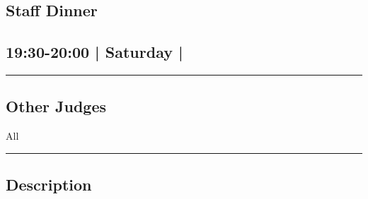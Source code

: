\documentclass[10pt, A5]{article}
\begin{document}
	

		\begin{framed}
			\begin{minipage}{\textwidth}

			\setcounter{section}{71}
							\section{Staff Dinner}
						
			\subsection*{19:30-20:00 | Saturday | }

			\vspace{0.25cm}
			\hrule
			\vspace{0.25cm}


			\subsection*{Other Judges}
							All

					\vspace{0.25cm}
			\hrule
			\vspace{0.25cm}

			\begin{minipage}{\textwidth}
			\subsection*{\faListAlt \: Description}
			
			\end{minipage}


	\end{minipage}
	\end{framed}

	
\end{document}
